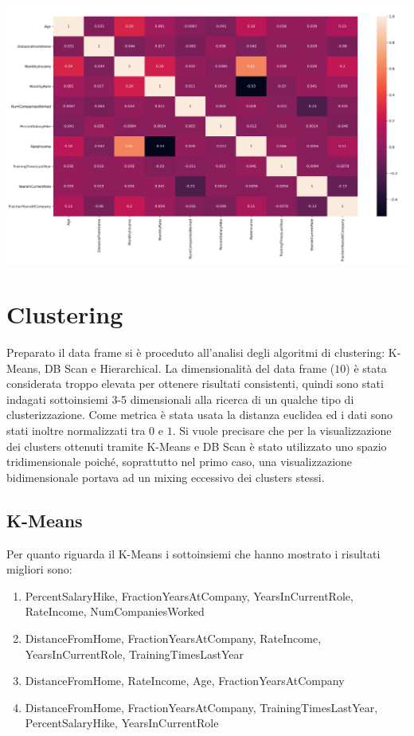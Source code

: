 \documentclass[a4paper,9pt]{article}
\begin{document}
\begin{center}
\includegraphics[scale=1.2]{macnum.png}
\end{center}

\section{Clustering}
Preparato il data frame si è proceduto all'analisi degli algoritmi di clustering: K-Means, DB Scan e Hierarchical. La dimensionalità del data frame ($10$) è stata considerata troppo elevata per ottenere risultati consistenti, quindi sono stati indagati sottoinsiemi 3-5 dimensionali alla ricerca di un qualche tipo di clusterizzazione. 
Come metrica è stata usata la distanza euclidea ed i dati sono stati inoltre normalizzati tra $0$ e $1$.
Si vuole precisare che per la visualizzazione dei clusters ottenuti tramite K-Means e DB Scan è stato utilizzato uno spazio tridimensionale poiché, soprattutto nel primo caso, una visualizzazione bidimensionale portava ad un mixing eccessivo dei clusters stessi.

\subsection{K-Means}
Per quanto riguarda il K-Means i sottoinsiemi che hanno mostrato i risultati migliori sono:

\begin{enumerate}
\item PercentSalaryHike, FractionYearsAtCompany, YearsInCurrentRole, RateIncome, NumCompaniesWorked
\item DistanceFromHome, FractionYearsAtCompany, RateIncome, YearsInCurrentRole, TrainingTimesLastYear
\item DistanceFromHome, RateIncome, Age, FractionYearsAtCompany
\item DistanceFromHome, FractionYearsAtCompany, TrainingTimesLastYear, PercentSalaryHike, YearsInCurrentRole
\end{enumerate}
\end{document}
